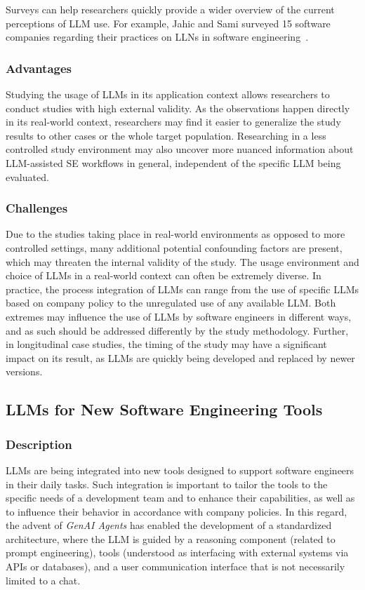 \documentclass[11pt]{article}
\begin{document}
Surveys can help researchers quickly provide a wider overview of the current perceptions of LLM use.
For example, Jahic and Sami surveyed 15 software companies regarding their practices on LLNs in software engineering~\cite{DBLP:conf/icsa/JahicS24}.

\subsubsection{Advantages}

Studying the usage of LLMs in its application context allows researchers to conduct studies with high external validity.
As the observations happen directly in its real-world context, researchers may find it easier to generalize the study results to other cases or the whole target population.
Researching in a less controlled study environment may also uncover more nuanced information about LLM-assisted SE workflows in general, independent of the specific LLM being evaluated.

\subsubsection{Challenges}

Due to the studies taking place in real-world environments as opposed to more controlled settings, many additional potential confounding factors are present, which may threaten the internal validity of the study.
The usage environment and choice of LLMs in a real-world context can often be extremely diverse.
In practice, the process integration of LLMs can range from the use of specific LLMs based on company policy to the unregulated use of any available LLM. 
Both extremes may influence the use of LLMs by software engineers in different ways, and as such should be addressed differently by the study methodology.
Further, in longitudinal case studies, the timing of the study may have a significant impact on its result, as LLMs are quickly being developed and replaced by newer versions.

\subsection{LLMs for New Software Engineering Tools}

\subsubsection{Description}

LLMs are being integrated into new tools designed to support software engineers in their daily tasks.
Such integration is important to tailor the tools to the specific needs of a development team and to enhance their capabilities, as well as to influence their behavior in accordance with company policies.
In this regard, the advent of \textit{GenAI Agents} has enabled the development of a standardized architecture, where the LLM is guided by a reasoning component (related to prompt engineering), tools (understood as interfacing with external systems via APIs or databases), and a user communication interface that is not necessarily limited to a chat.
\end{document}
